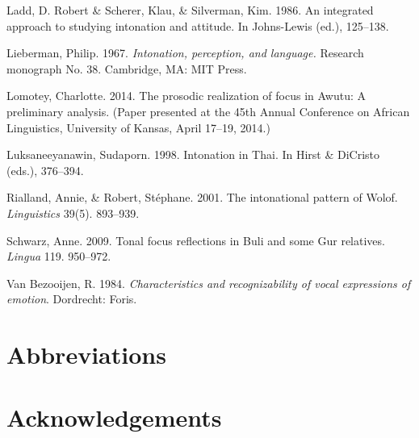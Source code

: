 \documentclass[output=paper]{langsci/langscibook}
\begin{document}
\begin{styleReferences}
Ladd, D. Robert \& Scherer, Klau, \& Silverman, Kim. 1986. An integrated approach to studying intonation and attitude. In Johns-Lewis (ed.),  125–138.
\end{styleReferences}

\begin{styleReferences}
Lieberman, Philip. 1967. \textit{Intonation, perception, and language. }Research monograph No. 38.\textit{ } Cambridge, MA: MIT Press.
\end{styleReferences}

\begin{styleReferences}
Lomotey, Charlotte.  2014. The prosodic realization of focus in Awutu: A preliminary analysis. (Paper presented at the 45th Annual Conference on African Linguistics, University of Kansas, April 17–19, 2014.)
\end{styleReferences}

\begin{styleReferences}
Luksaneeyanawin, Sudaporn. 1998. Intonation in Thai. In Hirst \& DiCristo (eds.), 376–394.
\end{styleReferences}

\begin{styleReferences}
Rialland, Annie, \& Robert, Stéphane. 2001. The intonational pattern of Wolof. \textit{Linguistics} 39(5). 893–939.
\end{styleReferences}

\begin{styleReferences}
Schwarz, Anne. 2009. Tonal focus reflections in Buli and some Gur relatives. \emph{Lingua} 119. 950–972.
\end{styleReferences}

\begin{styleBibliographyiv}
Van Bezooijen, R. 1984. \emph{Characteristics and recognizability of vocal expressions of emotion}. Dordrecht: Foris.
\end{styleBibliographyiv}



\section*{Abbreviations}
\section*{Acknowledgements}

{\sloppy
\printbibliography[heading=subbibliography,notkeyword=this]
}
\end{document}
